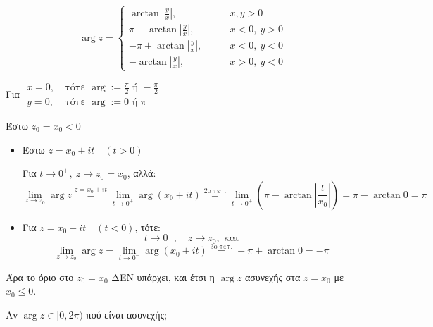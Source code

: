 \documentclass[12pt,a4paper,titlepage,fleqn]{article}
\begin{document}


    \[
    \arg z = \begin{cases}
    \arctan\left|\frac{y}{x}\right|, \qquad & x,y>0 \\
    \pi - \arctan\left|\frac{y}{x}\right|, \qquad & x<0,\ y>0 \\
    -\pi + \arctan\left|\frac{y}{x}\right|, \qquad & x<0,\ y<0 \\
    -\arctan\left|\frac{y}{x}\right|, \qquad & x>0,\ y<0
    \end{cases}
    \]

    Για \(
    \begin{array}{ll}
    x=0,\ & \text{τότε } \arg := \frac{\pi}{2} \text{ ή } -\frac{\pi}{2}\\
    y=0,\ & \text{τότε } \arg := 0\text{ ή }\pi
    \end{array}
     \)

    Έστω \( z_0 = x_0 < 0 \)
    \begin{itemize}
    	\item Έστω \( z = x_0+it \quad (t>0) \)

    	Για \( t\to0^+,\ z\to z_0=x_0 \), αλλά:
    	\[
    	\lim_{z\to z_0}\arg z \overset{z=x_0+it}{=}
    	\lim_{t\to0^+} \arg(x_0+it) \overset{\text{2ο τετ.}}{=}
    	\lim_{t\to0^+}\left(\pi-\arctan\left|\frac{t}{x_0}\right|\right)
    	=\pi-\arctan0=\pi
    	\]
    	\item Για \( z=x_0+it \quad (t<0) \), τότε:
    	\[
    	t\to0^-,\quad z\to z_0,\text{ και}
    	\]
    	\[
    	\lim_{z\to z_0}\arg z = \lim_{t\to0^-} \arg(x_0+it)
    	\overset{\text{3ο τετ.}}{=} -\pi+\arctan0 = -\pi
    	\]
    \end{itemize}
    Άρα το όριο στο \( z_0=x_0 \) ΔΕΝ υπάρχει, και έτσι η \( \arg z \)
    ασυνεχής στα \( z=x_0 \) με \( x_0\leq 0 \).

    Αν \( \arg z \in [0,2\pi) \) πού είναι ασυνεχής;
    
\end{document}
